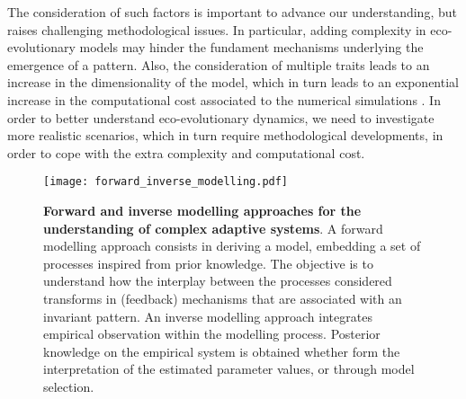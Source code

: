 % 
% 
The consideration of such factors is important to advance our understanding, but raises challenging methodological issues. 
% 
In particular, adding complexity in eco-evolutionary models may hinder the fundament mechanisms underlying the emergence of a pattern.
% 
Also, the consideration of multiple traits leads to an increase in the dimensionality of the model, which in turn leads to an exponential increase in the computational cost associated to the numerical simulations \citep{Bellman1957}.
% 
In order to better understand eco-evolutionary dynamics, we need to investigate more realistic scenarios, which in turn require methodological developments, in order to cope with the extra complexity and computational cost.
% 

\begin{figure}[t]
    \centering
    \texttt{[image: forward\_inverse\_modelling.pdf]}
    \caption{\textbf{Forward and inverse modelling approaches for the understanding of complex adaptive systems}. A forward modelling approach consists in deriving a model, embedding a set of processes inspired from prior knowledge. The objective is to understand how the interplay between the processes considered transforms in (feedback) mechanisms that are associated with an invariant pattern. An inverse modelling approach integrates empirical observation within the modelling process. Posterior knowledge on the empirical system is obtained whether form the interpretation of the estimated parameter values, or through model selection.
    }
    \label{fig:forward_inverse_modelling}
\end{figure}

